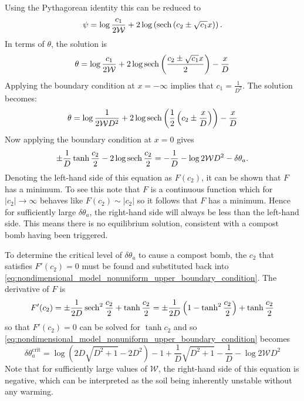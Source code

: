 Using the Pythagorean identity \parencite{riley2006} this can be reduced to
\begin{equation}
  \psi = \log \frac{c_1}{2\mathcal{W}} + 2\log \left(\sech \left(c_2 \pm \sqrt{c_1} x\right)\right).
\end{equation}
In terms of $\theta$, the solution is
\begin{equation}
  \label{eq:nondimensional_model_nonuniform_solution_general}
  \theta = \log \frac{c_1}{2\mathcal{W}} + 2 \log \sech \left( \frac{c_2 \pm \sqrt{c_1} x}{2}\right) - \frac{x}{D}
\end{equation}
Applying the boundary condition at $x = -\infty$ implies that $c_1 = \frac{1}{D^2}$.  The solution becomes:
\begin{equation}
  \label{eq:nondimensional_model_nonuniform_solution_one_bc}
  \theta = \log \frac{1}{2\mathcal{W}D^2} + 2 \log \sech \left( \frac{1}{2} \left(c_2 \pm \frac{x}{D}\right)\right) - \frac{x}{D}
\end{equation}
Now applying the boundary condition at $x = 0$ gives
\begin{equation}
  \label{eq:nondimensional_model_nonuniform_upper_boundary_condition}
  \pm\frac{1}{D}\tanh \frac{c_2}{2} - 2 \log \sech \frac{c_2}{2} = -\frac{1}{D} - \log 2\mathcal{W}D^2 - \delta\theta_a.
\end{equation}
Denoting the left-hand side of this equation as $F(c_2)$, it can be shown that $F$ has a minimum. To see this note that $F$ is a continuous function which
for $|c_2| \rightarrow \infty$ behaves like $F(c_2) \sim |c_2|$ so it follows %
that $F$ has a minimum. Hence for sufficiently large $\delta\theta_a$, the right-hand side will always
be less than the left-hand side. This means there is no equilibrium solution, consistent with a compost bomb having been triggered.

To determine the critical level of $\delta\theta_a$ to cause a compost bomb,
the $c_2$ that satisfies $F'(c_2) = 0$ must be found and substituted back into \cref{eq:nondimensional_model_nonuniform_upper_boundary_condition}. The derivative of $F$
is
\begin{equation}
  F'(c_2) = \pm \frac{1}{2D}\sech^2 \frac{c_2}{2} + \tanh \frac{c_2}{2} = \pm \frac{1}{2D}\left(1 - \tanh^2 \frac{c_2}{2}\right) + \tanh \frac{c_2}{2} 
\end{equation}
so that $F'(c_2) = 0$ can be solved for $\tanh c_2$ and so \cref{eq:nondimensional_model_nonuniform_upper_boundary_condition} becomes
\begin{equation}
  \label{eq:nondimensional_model_nonuniform_critical_warming}
  \delta\theta_a^{\mathrm{crit}} = \log \left(2D\sqrt{D^2 +1} - 2D^2\right) -1 + \frac{1}{D} \sqrt{D^2 + 1} - \frac{1}{D} - \log 2\mathcal{W}D^2
\end{equation}
Note that for sufficiently large values of $\mathcal{W}$, the right-hand side of this equation is negative, which can be interpreted as the soil being inherently unstable without any warming.

